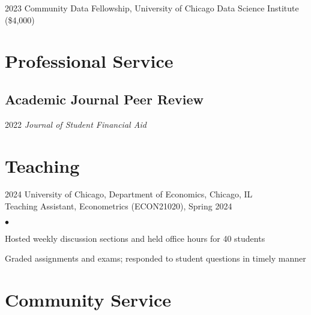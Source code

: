 \documentclass[11pt,letterpaper]{report}
\newenvironment{list2}{
  \begin{list}{\tiny$\bullet$}{%
      \setlength{\itemsep}{0in}
      \setlength{\parsep}{0in} \setlength{\parskip}{0in}
      \setlength{\topsep}{0in} \setlength{\partopsep}{0in} 
      \setlength{\leftmargin}{0.2in}}}{\end{list}}
\begin{document}
\begin{tablist}
  \item[2023] \tab{} Community Data Fellowship, University of Chicago Data Science Institute (\$4,000)
\end{tablist}

\section*{Professional Service}

\subsection*{Academic Journal Peer Review}
\begin{tablist}
  \item[2022] \tab{} \emph{Journal of Student Financial Aid}
\end{tablist}

\section*{Teaching}

\begin{tablist}
\item[2024] \tab{}University of Chicago, Department of Economics, Chicago, IL\\ 
Teaching Assistant, Econometrics (ECON21020), Spring 2024\\ 
\vspace*{.05in}  
\begin{list2}
\item Hosted weekly discussion sections and held office hours for 40 students 
\item Graded assignments and exams; responded to student questions in timely manner  
\end{list2}
\end{tablist} 

\section*{Community Service}
\end{document}
